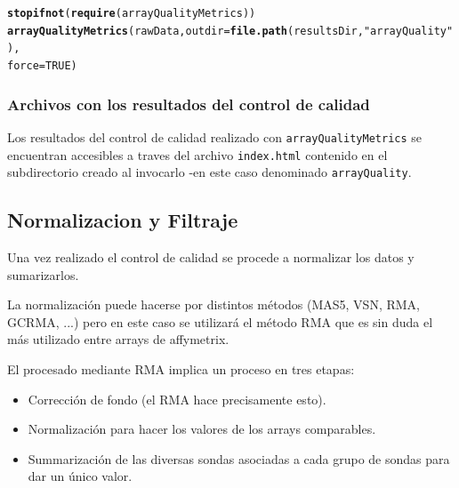 \documentclass[a4paper]{article}\usepackage[]{graphicx}\usepackage[]{color}
\makeatletter
\newcommand{\hlnum}[1]{\textcolor[rgb]{0.686,0.059,0.569}{#1}}%
\newcommand{\hlstr}[1]{\textcolor[rgb]{0.192,0.494,0.8}{#1}}%
\newcommand{\hlstd}[1]{\textcolor[rgb]{0.345,0.345,0.345}{#1}}%
\newcommand{\hlkwc}[1]{\textcolor[rgb]{0.333,0.667,0.333}{#1}}%
\newcommand{\hlkwd}[1]{\textcolor[rgb]{0.737,0.353,0.396}{\textbf{#1}}}%
\newenvironment{kframe}{%
 \def\at@end@of@kframe{}%
 \ifinner\ifhmode%
  \def\at@end@of@kframe{\end{minipage}}%
  \begin{minipage}{\columnwidth}%
 \fi\fi%
 \def\FrameCommand##1{\hskip\@totalleftmargin \hskip-\fboxsep
 \colorbox{shadecolor}{##1}\hskip-\fboxsep
     \hskip-\linewidth \hskip-\@totalleftmargin \hskip\columnwidth}%
 \MakeFramed {\advance\hsize-\width
   \@totalleftmargin\z@ \linewidth\hsize
   \@setminipage}}%
 {\par\unskip\endMakeFramed%
 \at@end@of@kframe}
\newenvironment{knitrout}{}{} %
\makeatother
\begin{document}
\begin{knitrout}
\color{fgcolor}\begin{kframe}
\begin{alltt}
\hlkwd{stopifnot}\hlstd{(}\hlkwd{require}\hlstd{(arrayQualityMetrics))}
\hlkwd{arrayQualityMetrics}\hlstd{(rawData,} \hlkwc{outdir} \hlstd{=} \hlkwd{file.path}\hlstd{(resultsDir,} \hlstr{"arrayQuality"}\hlstd{),}
                    \hlkwc{force}\hlstd{=}\hlnum{TRUE}\hlstd{)}
\end{alltt}


{\ttfamily\noindent\itshape\color{messagecolor}{\#\# The report will be written into directory 'C:/Users/Alexandre/Dropbox (VHIR)/SotaCV/Ejemplo\_de\_MDA\_con\_Bioconductor/results/arrayQuality'.}}\end{kframe}
\end{knitrout}

\subsubsection{Archivos con los resultados del control de calidad}

Los resultados del control de calidad realizado con \texttt{arrayQualityMetrics} se encuentran  accesibles a traves del archivo \texttt{index.html} contenido en el subdirectorio creado al invocarlo -en este caso denominado \texttt{arrayQuality}.


\subsection{Normalizacion y Filtraje}

Una vez realizado el control de calidad se procede a normalizar los datos y sumarizarlos.

La normalización puede hacerse por distintos métodos (MAS5, VSN, RMA, GCRMA, ...) pero en este caso se utilizará el método RMA que es sin duda el más utilizado entre arrays de affymetrix.

El procesado mediante RMA implica un proceso en tres etapas: 
\begin{itemize}
\item Corrección de fondo (el RMA hace precisamente esto).
\item Normalización para hacer los valores de los arrays comparables.
\item Summarización de las diversas sondas asociadas a cada grupo de sondas para dar un único valor.
\end{itemize}
\end{document}

